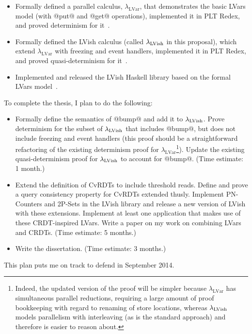 \documentclass{article}
\begin{document}
\begin{itemize}
  \item Formally defined a parallel calculus,
    $\lambda_{\textrm{LVar}}$, that demonstrates the basic LVars model
    (with @put@ and @get@ operations), implemented it in PLT Redex,
    and proved determinism for it~\cite{LVars-paper, LVars-TR}.

  \item Formally defined the LVish calculus (called $\lambda_{\textrm{LVish}}$ in
    this proposal), which extend $\lambda_{\textrm{LVar}}$ with
    freezing and event handlers, implemented it in PLT Redex, and
    proved quasi-determinism for it~\cite{Freeze-paper, Freeze-TR}.

  \item Implemented and released the LVish Haskell library based on
    the formal LVars model~\cite{Freeze-paper}.
\end{itemize}
To complete the thesis, I plan to do the following:
\begin{itemize}
\item Formally define the semantics of @bump@ and add it to
  $\lambda_{\textrm{LVish}}$.  Prove determinism for the subset of $\lambda_{\textrm{LVish}}$
  that includes @bump@, but does not include freezing and event
  handlers (this proof should be a straightforward refactoring of the
  existing determinism proof for
  $\lambda_{\textrm{LVar}}$\footnote{Indeed, the updated version of
    the proof will be simpler because $\lambda_{\textrm{LVar}}$ has
    simultaneous parallel reductions, requiring a large amount of
    proof bookkeeping with regard to renaming of store locations,
    whereas $\lambda_{\textrm{LVish}}$ models parallelism with interleaving (as is
    the standard approach) and therefore is easier to reason about.}).
  Update the existing quasi-determinism proof for $\lambda_{\textrm{LVish}}$ to
  account for @bump@.  (Time estimate: 1 month.)

\item Extend the definition of CvRDTs to include threshold reads.
  Define and prove a query consistency property for CvRDTs extended
  thusly.  Implement PN-Counters and 2P-Sets in the LVish library and
  release a new version of LVish with these extensions.  Implement at
  least one application that makes use of these CRDT-inspired LVars.
  Write a paper on my work on combining LVars and CRDTs.  (Time
  estimate: 5 months.)

\item Write the dissertation. (Time estimate: 3 months.)
\end{itemize}
This plan puts me on track to defend in September 2014.



\end{document}
